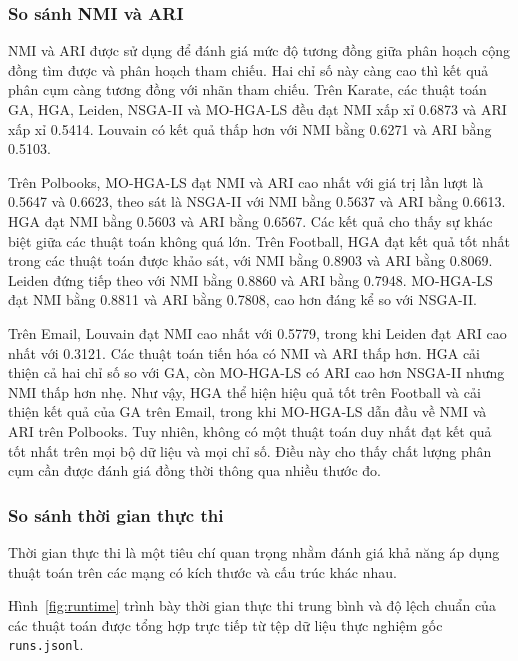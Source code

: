 \documentclass[14pt,a4paper]{extarticle}
\begin{document}
\subsubsection{So sánh NMI và ARI}
NMI và ARI được sử dụng để đánh giá mức độ tương đồng giữa phân hoạch cộng đồng tìm được và phân hoạch tham chiếu. Hai chỉ số này càng cao thì kết quả phân cụm càng tương đồng với nhãn tham chiếu.
Trên Karate, các thuật toán GA, HGA, Leiden, NSGA-II và MO-HGA-LS đều đạt NMI xấp xỉ 0.6873 và ARI xấp xỉ 0.5414. Louvain có kết quả thấp hơn với NMI bằng 0.6271 và ARI bằng 0.5103.

Trên Polbooks, MO-HGA-LS đạt NMI và ARI cao nhất với giá trị lần lượt là 0.5647 và 0.6623, theo sát là NSGA-II với NMI bằng 0.5637 và ARI bằng 0.6613. HGA đạt NMI bằng 0.5603 và ARI bằng 0.6567. Các kết quả cho thấy sự khác biệt giữa các thuật toán không quá lớn.
Trên Football, HGA đạt kết quả tốt nhất trong các thuật toán được khảo sát, với NMI bằng 0.8903 và ARI bằng 0.8069. Leiden đứng tiếp theo với NMI bằng 0.8860 và ARI bằng 0.7948. MO-HGA-LS đạt NMI bằng 0.8811 và ARI bằng 0.7808, cao hơn đáng kể so với NSGA-II.

Trên Email, Louvain đạt NMI cao nhất với 0.5779, trong khi Leiden đạt ARI cao nhất với 0.3121. Các thuật toán tiến hóa có NMI và ARI thấp hơn. HGA cải thiện cả hai chỉ số so với GA, còn MO-HGA-LS có ARI cao hơn NSGA-II nhưng NMI thấp hơn nhẹ.
Như vậy, HGA thể hiện hiệu quả tốt trên Football và cải thiện kết quả của GA trên Email, trong khi MO-HGA-LS dẫn đầu về NMI và ARI trên Polbooks. Tuy nhiên, không có một thuật toán duy nhất đạt kết quả tốt nhất trên mọi bộ dữ liệu và mọi chỉ số. Điều này cho thấy chất lượng phân cụm cần được đánh giá đồng thời thông qua nhiều thước đo.

\subsubsection{So sánh thời gian thực thi}

Thời gian thực thi là một tiêu chí quan trọng nhằm đánh giá khả năng áp dụng thuật toán trên các mạng có kích thước và cấu trúc khác nhau.

Hình~\ref{fig:runtime} trình bày thời gian thực thi trung bình và độ lệch chuẩn của các thuật toán được tổng hợp trực tiếp từ tệp dữ liệu thực nghiệm gốc \texttt{runs.jsonl}.

\end{document}

